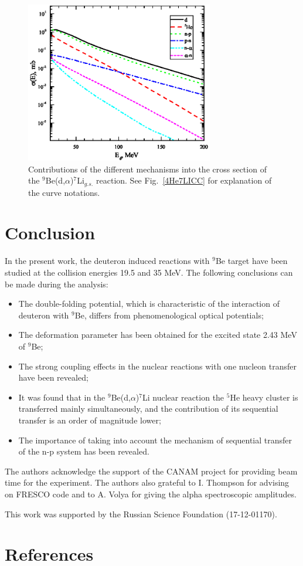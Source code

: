\documentclass[10pt]{iopart}
\begin{document}
\begin{figure}[tp]
\centering
\includegraphics[width=8.2cm]{CS.eps}
\caption{\label{CS} Contributions of the different mechanisms into the cross section of the ${}^9$Be(d,$\alpha$)${}^7$Li$_{g.s.}$ reaction. See Fig.~\ref{4He7LICC} for explanation of the curve notations.}
\end{figure}	
	
\section{Conclusion}
In the present work, the deuteron induced reactions with ${}^9$Be target have been studied at the collision energies 19.5 and 35 MeV. The following conclusions can be made during the analysis:
\begin{itemize}
\item The double-folding potential, which is characteristic of the interaction of deuteron with ${}^9$Be, differs from phenomenological optical potentials;
\item  The deformation parameter has been obtained for the excited state 2.43 MeV of ${}^9$Be;
\item The strong coupling effects in the nuclear reactions with one nucleon transfer have been revealed;
\item It was found that  in the ${}^9$Be(d,$\alpha$)${}^7$Li nuclear reaction the ${}^5$He heavy cluster  is transferred mainly simultaneously, and the contribution of its sequential transfer is an order of magnitude lower;
\item The importance of taking into account the mechanism of sequential transfer of the n-p system has been revealed.
\end{itemize}

\ack
	The authors acknowledge the support of the CANAM project \cite{canam} for providing beam time for the experiment. The authors also grateful to I. Thompson for advising on FRESCO code and to A. Volya for giving the alpha spectroscopic amplitudes.

This work was supported by the Russian Science Foundation (17-12-01170).



\section*{References}



\end{document}
